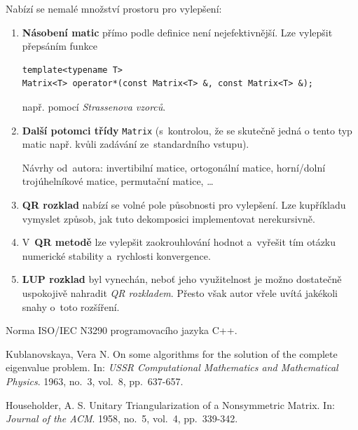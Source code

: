 \documentclass[11pt,a4paper]{article}
\newcommand{\cpp}{\textsc{C++}}
\theoremstyle{remark}
\begin{document}
Nabízí se nemalé množství prostoru pro vylepšení:
\begin{enumerate}
  \item {\bf Násobení matic\/} přímo podle definice není nejefektivnější.
    Lze vylepšit přepsáním funkce
\begin{verbatim}template<typename T>
Matrix<T> operator*(const Matrix<T> &, const Matrix<T> &);\end{verbatim}
    např. pomocí \emph{Strassenova vzorců\/}.
  \item {\bf Další potomci třídy\/} \verb=Matrix= (s~kontrolou, že se skutečně
    jedná o tento typ matic např. kvůli zadávání ze~standardního vstupu).

    Návrhy od~autora: invertibilní matice, ortogonální matice, horní/dolní
    trojúhelníkové matice, permutační matice, \ldots
  \item {\bf QR rozklad\/} nabízí se volné pole působnosti pro vylepšení.
    Lze ku\-pří\-kla\-du vymyslet způsob, jak tuto dekomposici implementovat
    nerekursivně.
  \item V~{\bf QR metodě\/} lze vylepšit zaokrouhlování hodnot a~vyřešit tím
    otázku numerické stability a~rychlosti konvergence.
  \item {\bf LUP rozklad\/} byl vynechán, neboť jeho využitelnost je možno
    do\-sta\-teč\-ně uspokojivě nahradit \emph{QR rozkladem\/}.
    Přesto však autor vřele uvítá jakékoli snahy o~toto rozšíření.
\end{enumerate}

\pagebreak

\begin{thebibliography}{9}

Norma \textsc{ISO/IEC N3290} programovacího jazyka \cpp.

  {\sc Kublanovskaya}, Vera N.
  On some algorithms for the solution of the complete eigenvalue problem.
  In: \emph{USSR Computational Mathematics and Mathematical Physics\/}.
  1963,
  no.~3,
  vol.~8,
  pp.~637-657.

  {\sc Householder}, A. S.
  Unitary Triangularization of a Nonsymmetric Matrix.
  In: \emph{Journal of the ACM\/}.
  1958,
  no.~5,
  vol.~4,
  pp.~339-342.

\end{thebibliography}
\end{document}
